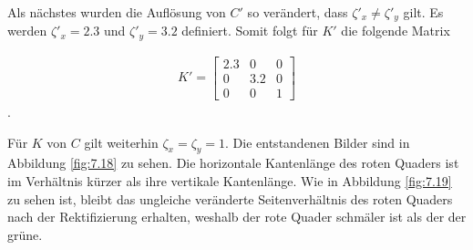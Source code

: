 Als nächstes wurden die Auflösung von $C'$ so verändert, dass $\zeta'_x \neq \zeta'_y$ gilt. Es werden $\zeta'_x = 2.3$  und $\zeta'_y = 3.2$ definiert. Somit folgt für $K'$ die folgende Matrix

\begin{gather}
	K' = 
	\begin{bmatrix}
	2.3&0&0\\
	0&3.2&0\\
	0&0&1
	\end{bmatrix}
\end{gather}.

Für $K$ von $C$ gilt weiterhin $\zeta_x = \zeta_y = 1$. Die entstandenen Bilder sind in Abbildung \ref{fig:7.18} zu sehen. Die horizontale Kantenlänge des roten Quaders ist im Verhältnis kürzer als ihre vertikale Kantenlänge. Wie in Abbildung \ref{fig:7.19} zu sehen ist, bleibt das ungleiche veränderte Seitenverhältnis des roten Quaders nach der Rektifizierung erhalten, weshalb der rote Quader schmäler ist als der der grüne.


